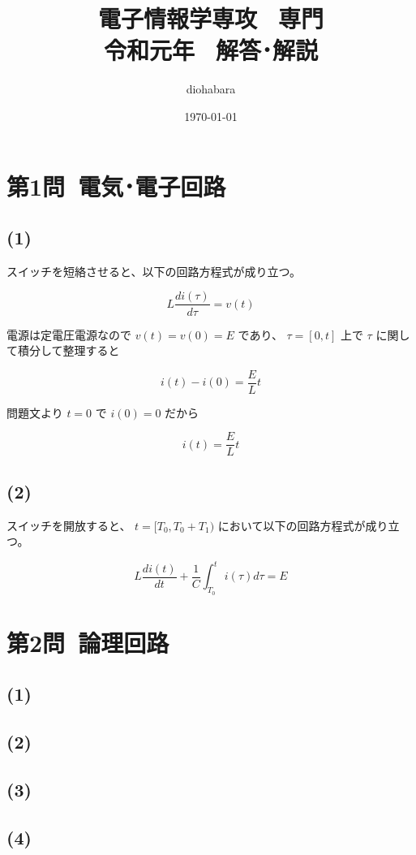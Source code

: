\documentclass[a4paper,12pt,xelatex,ja=standard]{bxjsarticle}
\title{電子情報学専攻 \, 専門 \\ 令和元年 \, 解答･解説}
\author{diohabara}
\date{\today}
\begin{document}
\maketitle

\section*{第1問\ 電気･電子回路}

\subsection*{(1)}


スイッチを短絡させると、以下の回路方程式が成り立つ。

\[
  L \frac{d i(\tau)}{d \tau} = v(t)
\]

電源は定電圧電源なので \(v(t) = v(0) = E\) であり、 \(\tau = [0, t]\) 上で \(\tau\) に関して積分して整理すると

\[
  i(t) - i(0) = \frac{E}{L}t
\]

問題文より $t = 0$ で $i(0) = 0$ だから

\[
  i(t) = \frac{E}{L}t
\]

\subsection*{(2)}

スイッチを開放すると、 \(t = [T_0, T_0 + T_1)\) において以下の回路方程式が成り立つ。

\[
  L \frac{d i(t)}{d t} + \frac{1}{C}\int^{t}_{T_0}i(\tau) d \tau = E
\]

\section*{第2問\ 論理回路}
  \subsection*{(1)}
  \subsection*{(2)}
  \subsection*{(3)}
  \subsection*{(4)}
\end{document}
